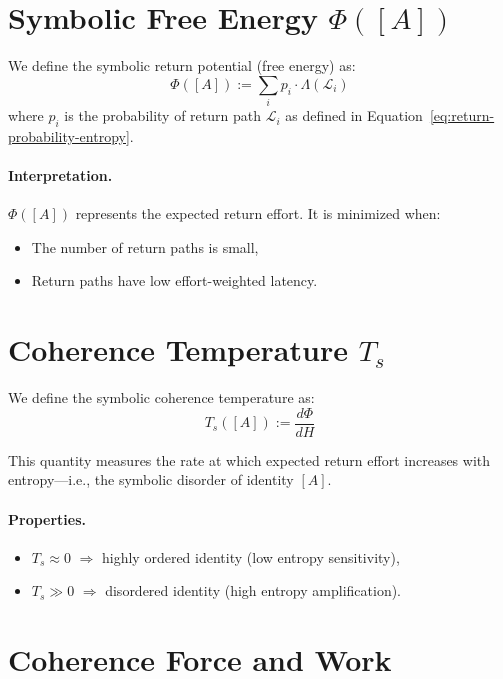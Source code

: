 \section{Symbolic Free Energy $\Phi([A])$} \label{symbolic-free-energy-phi}

We define the symbolic return potential (free energy) as:
\begin{equation} \label{eq:free-energy}
\Phi([A]) := \sum_i p_i \cdot \Lambda(\mathcal{L}_i)
\end{equation}
where $p_i$ is the probability of return path $\mathcal{L}_i$ as defined in Equation~\ref{eq:return-probability-entropy}.

\paragraph{Interpretation.}
$\Phi([A])$ represents the expected return effort. It is minimized when:
\begin{itemize}
    \item The number of return paths is small,
    \item Return paths have low effort-weighted latency.
\end{itemize}

\section{Coherence Temperature $T_s$} \label{coherence-temperature-ts}

We define the symbolic coherence temperature as:
\begin{equation} \label{eq:coherence-temperature}
T_s([A]) := \frac{d\Phi}{dH}
\end{equation}

This quantity measures the rate at which expected return effort increases with entropy—i.e., the symbolic disorder of identity $[A]$.

\paragraph{Properties.}
\begin{itemize}
    \item $T_s \approx 0$ $\Rightarrow$ highly ordered identity (low entropy sensitivity),
    \item $T_s \gg 0$ $\Rightarrow$ disordered identity (high entropy amplification).
\end{itemize}

\section{Coherence Force and Work} \label{coherence-force-and-work}

